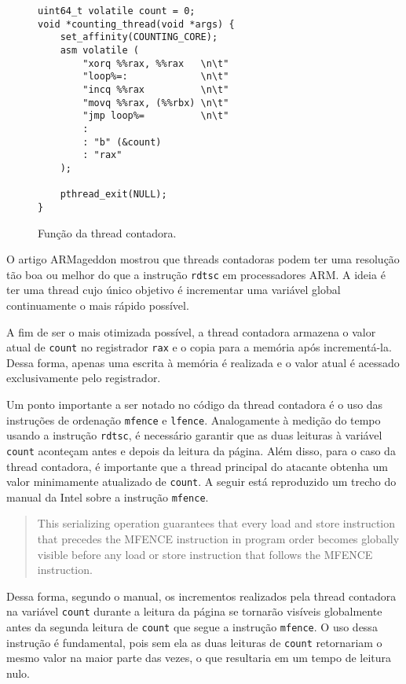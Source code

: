 \documentclass[twocolumn, 12pt]{article}
\begin{document}
\begin{figure}[h]
\begin{verbatim}
uint64_t volatile count = 0;
void *counting_thread(void *args) {
	set_affinity(COUNTING_CORE);
	asm volatile (
		"xorq %%rax, %%rax   \n\t"
		"loop%=:             \n\t"
		"incq %%rax          \n\t"
		"movq %%rax, (%%rbx) \n\t"
		"jmp loop%=          \n\t"
		:
		: "b" (&count)
		: "rax"
	);

	pthread_exit(NULL);
}
\end{verbatim}
\caption{Função da thread contadora.}
\end{figure}

O artigo ARMageddon \cite{armageddon}
mostrou que threads contadoras
podem ter uma resolução tão boa
ou melhor do que a instrução \texttt{rdtsc}
em processadores ARM.
A ideia é ter uma thread
cujo único objetivo é
incrementar uma variável global
continuamente o mais rápido possível.

A fim de ser o mais otimizada possível,
a thread contadora armazena
o valor atual de \texttt{count}
no registrador \texttt{rax}
e o copia para a memória
após incrementá-la.
Dessa forma,
apenas uma escrita à memória é realizada
e o valor atual é acessado
exclusivamente pelo registrador.

Um ponto importante a ser notado
no código da thread contadora é
o uso das instruções de ordenação
\texttt{mfence} e \texttt{lfence}.
Analogamente à medição do tempo
usando a instrução \texttt{rdtsc},
é necessário garantir que as duas
leituras à variável \texttt{count}
aconteçam antes e depois da leitura da página.
Além disso,
para o caso da thread contadora,
é importante que a thread principal do atacante
obtenha um valor minimamente atualizado de \texttt{count}.
A seguir está reproduzido
um trecho do manual da Intel
sobre a instrução \texttt{mfence}.

\foreignblockquote{english}[\cite{intel}]{
This serializing operation guarantees that
every load and store instruction that
precedes the MFENCE instruction in program order
becomes globally visible
before any load or store instruction that
follows the MFENCE instruction.
}

Dessa forma,
segundo o manual,
os incrementos realizados pela
thread contadora na variável \texttt{count}
durante a leitura da página
se tornarão visíveis globalmente
antes da segunda leitura de \texttt{count}
que segue a instrução \texttt{mfence}.
O uso dessa instrução é fundamental,
pois sem ela as duas leituras de \texttt{count}
retornariam o mesmo valor na maior parte das vezes,
o que resultaria em um tempo de leitura nulo.
\end{document}
